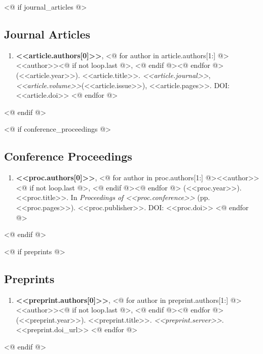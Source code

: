 
\begin{cvparagraph}
<@ if journal_articles @>
\subsection*{Journal Articles}
\begin{enumerate}
<@ for article in journal_articles @>
    \item \textbf{<<article.authors[0]>>}, <@ for author in article.authors[1:] @><<author>><@ if not loop.last @>, <@ endif @><@ endfor @> (<<article.year>>). <<article.title>>. \textit{<<article.journal>>}, \textit{<<article.volume>>}(<<article.issue>>), <<article.pages>>. DOI: <<article.doi>>
<@ endfor @>
\end{enumerate}
<@ endif @>

<@ if conference_proceedings @>
\subsection*{Conference Proceedings}
\begin{enumerate}
<@ for proc in conference_proceedings @>
    \item \textbf{<<proc.authors[0]>>}, <@ for author in proc.authors[1:] @><<author>><@ if not loop.last @>, <@ endif @><@ endfor @> (<<proc.year>>). <<proc.title>>. In \textit{Proceedings of <<proc.conference>>} (pp. <<proc.pages>>). <<proc.publisher>>. DOI: <<proc.doi>>
<@ endfor @>
\end{enumerate}
<@ endif @>

<@ if preprints @>
\subsection*{Preprints}
\begin{enumerate}
<@ for preprint in preprints @>
    \item \textbf{<<preprint.authors[0]>>}, <@ for author in preprint.authors[1:] @><<author>><@ if not loop.last @>, <@ endif @><@ endfor @> (<<preprint.year>>). <<preprint.title>>. \textit{<<preprint.server>>}. <<preprint.doi_url>>
<@ endfor @>
\end{enumerate}
<@ endif @>
\end{cvparagraph}

